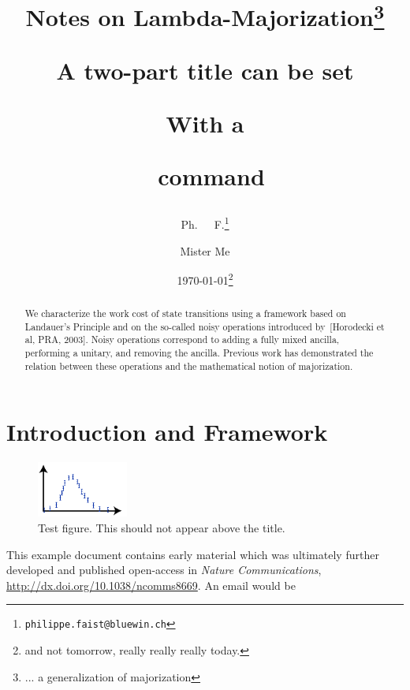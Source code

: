 \documentclass[11pt,a4paper]{article}
\title{Notes on Lambda-Majorization\thanks[9]{... a generalization of majorization}%
%
}
\author{Ph.\thanksmark[9]~~~F.\thanks{\texttt{philippe{.}faist{@}{}b{}l{}u{}e{}win.ch}}}
\date{\today\thanks{and not tomorrow, really really really today.}}
\title{A two-part title can be set\par With a \string\par\ command}
\author{Mister Me}
\newif\iftestnoteNeedsMinPkgs\testnoteNeedsMinPkgsfalse
\theoremstyle{plain}
\begin{document}
\maketitle

\begin{abstract}
  We characterize the work cost of state transitions using a framework based on
  Landauer's Principle and on the so-called noisy operations introduced
  by~[Horodecki et al, PRA, 2003]. Noisy operations correspond to adding a fully
  mixed ancilla, performing a unitary, and removing the ancilla. Previous work
  has demonstrated the relation between these operations and the mathematical
  notion of majorization.

  \iftestnoteNeedsMinPkgs ([NeedsMinPkgs=TRUE])\fi
\end{abstract}

\inlinetoc


\section{Introduction and Framework}

\begin{figure}[t]
  \centering
  \includegraphics[width=3cm]{testfigure}
  \caption{Test figure. This should not appear above the title.}
  \label{fig:test}
\end{figure}

This example document contains early material which was ultimately further developed and
published open-access in \emph{Nature Communications},
\url{http://dx.doi.org/10.1038/ncomms8669}.  An email would be 
\end{document}
